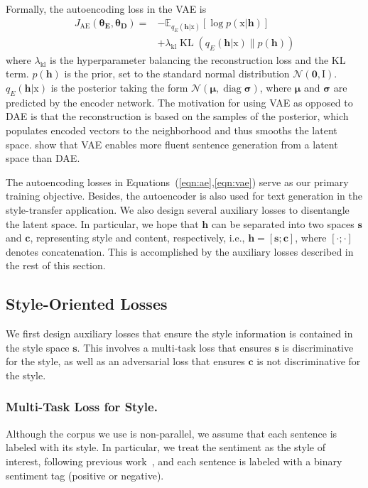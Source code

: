 \documentclass[letterpaper]{article} %
\newcommand{\rmx}{\mathrm x}
\newcommand{\loss}[1]{J_{\text{#1}}}
\newcommand{\hyp}[1]{\lambda_{\text{#1}}}
\newcommand{\nnweight}[1]{\bm{\theta_{\text{#1}}}}
\begin{document}
Formally, the autoencoding loss in the VAE is
\begin{align}\label{eqn:vae}
	\loss{AE}(\nnweight{E}, \nnweight{D}) = & - \mathbb{E}_{q_{E}(\bm h|\rmx)} [\log p(\rmx|\bm h)]  \nonumber \\
	                                        & + \hyp{kl}\operatorname{KL}(q_{E}(\bm h|\rmx)\|p(\bm h))
\end{align}
where $\hyp{kl}$ is the hyperparameter balancing the reconstruction loss and the KL term. $p(\bm h)$ is the prior, set to the standard normal distribution $\mathcal{N}(\bm 0,\mathrm I)$. $q_E(\bm h|\mathrm x)$ is the posterior taking the form $\mathcal{N}(\bm \mu,\operatorname{diag} \bm\sigma)$, where $\bm\mu$ and $\bm\sigma$ are predicted by the encoder network.
The motivation for using VAE as opposed to DAE is that the reconstruction is based on the samples of the posterior, which populates encoded vectors to the neighborhood and thus smooths the latent space.
\citet{bowman2016generating} show that VAE enables more fluent sentence generation from a latent space than DAE.

The autoencoding losses in Equations~(\ref{eqn:ae},\ref{eqn:vae}) serve as our primary training objective.
Besides, the autoencoder is also used for text generation in the style-transfer application.
We also design several auxiliary losses to disentangle the latent space. In particular, we hope that $\bm h$ can be separated into two spaces $\bm s$ and $\bm c$, representing style and content, respectively, i.e., $\bm h = [\bm s ; \bm c]$, where $[\cdot;\cdot]$ denotes concatenation.
This is accomplished by the auxiliary losses described in the rest of this section.


\subsection{Style-Oriented Losses}

We first design auxiliary losses that ensure the style information is contained in the style space $\bm s$.
This involves a multi-task loss that ensures $\bm s$ is discriminative for the style, as well as an adversarial loss that ensures $\bm c$ is not discriminative for the style.

\subsubsection{Multi-Task Loss for Style.} \label{ssec:multitask-style-objective}
Although the corpus we use is non-parallel, we assume that each sentence is labeled with its style. In particular, we treat the sentiment as the style of interest, following previous work~\cite{hu2017toward,shen2017style,fu2018style,zhao2018adversarially}, and each sentence is labeled with a binary sentiment tag (positive or negative).
\end{document}

